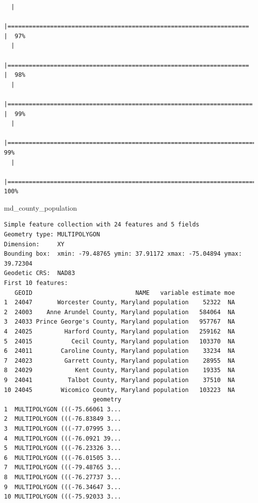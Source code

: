 \documentclass[
  letterpaper,
  DIV=11,
  numbers=noendperiod]{scrreprt}
\newenvironment{Shaded}{\begin{snugshade}}{\end{snugshade}}
\newcommand{\NormalTok}[1]{\textcolor[rgb]{0.00,0.23,0.31}{#1}}
\begin{document}
\begin{verbatim}
  |                                                                            
  |====================================================================  |  97%
  |                                                                            
  |====================================================================  |  98%
  |                                                                            
  |===================================================================== |  99%
  |                                                                            
  |======================================================================|  99%
  |                                                                            
  |======================================================================| 100%
\end{verbatim}

\begin{Shaded}
\begin{Highlighting}[]
\NormalTok{md\_county\_population}
\end{Highlighting}
\end{Shaded}

\begin{verbatim}
Simple feature collection with 24 features and 5 fields
Geometry type: MULTIPOLYGON
Dimension:     XY
Bounding box:  xmin: -79.48765 ymin: 37.91172 xmax: -75.04894 ymax: 39.72304
Geodetic CRS:  NAD83
First 10 features:
   GEOID                             NAME   variable estimate moe
1  24047       Worcester County, Maryland population    52322  NA
2  24003    Anne Arundel County, Maryland population   584064  NA
3  24033 Prince George's County, Maryland population   957767  NA
4  24025         Harford County, Maryland population   259162  NA
5  24015           Cecil County, Maryland population   103370  NA
6  24011        Caroline County, Maryland population    33234  NA
7  24023         Garrett County, Maryland population    28955  NA
8  24029            Kent County, Maryland population    19335  NA
9  24041          Talbot County, Maryland population    37510  NA
10 24045        Wicomico County, Maryland population   103223  NA
                         geometry
1  MULTIPOLYGON (((-75.66061 3...
2  MULTIPOLYGON (((-76.83849 3...
3  MULTIPOLYGON (((-77.07995 3...
4  MULTIPOLYGON (((-76.0921 39...
5  MULTIPOLYGON (((-76.23326 3...
6  MULTIPOLYGON (((-76.01505 3...
7  MULTIPOLYGON (((-79.48765 3...
8  MULTIPOLYGON (((-76.27737 3...
9  MULTIPOLYGON (((-76.34647 3...
10 MULTIPOLYGON (((-75.92033 3...
\end{verbatim}
\end{document}
